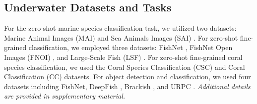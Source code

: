 
\subsection{Underwater Datasets and Tasks}
For the zero-shot marine species classification task, we utilized two datasets: Marine Animal Images (MAI) \cite{marine_animal} and Sea Animals Images (SAI) \cite{sea_animal}.
For zero-shot fine-grained classification, we employed three datasets: FishNet \cite{khan2023fishnet}, FishNet Open Images (FNOI) \cite{kay2021fishnet}, and Large-Scale Fish (LSF) \cite{ulucan2020large}.
For zero-shot fine-grained coral species classification, we used the Coral Species Classification (CSC) \cite{coral-species-classification_dataset} and Coral Classification (CC) \cite{coral_classification} datasets.
For object detection and classification, we used four datasets including FishNet, DeepFish \cite{saleh2020realistic}, Brackish \cite{Pedersen_2019_CVPR_Workshops}, and URPC \cite{urpc}.
\textit{Additional details are provided in supplementary material.}
\begin{comment}
\subsection{Downstream Datasets}
For supervised salient object segmentation of underwater images, we used the USOD10K dataset \cite{usod10k}.
For supervised instance segmentation of marine images, we employed the Underwater Image Instance Segmentation (UIIS) \cite{Lian_2023_ICCV}, and for semantic segmentation, we used the SUIM \cite{islam2020suim} dataset. 
For fine-tuned underwater object detection and classification tasks, we used four datasets: FishNet \cite{khan2023fishnet}, DeepFish \cite{saleh2020realistic}, URPC \cite{urpc}, and Brackish \cite{Pedersen_2019_CVPR_Workshops}. 
Lastly, for the biodiversity-related marine object counting task, we used the IOCFish5K \cite{sun2023indiscernible} dataset.
\textbf{\textit{See more details in our supplementary material.}}
\end{comment}

